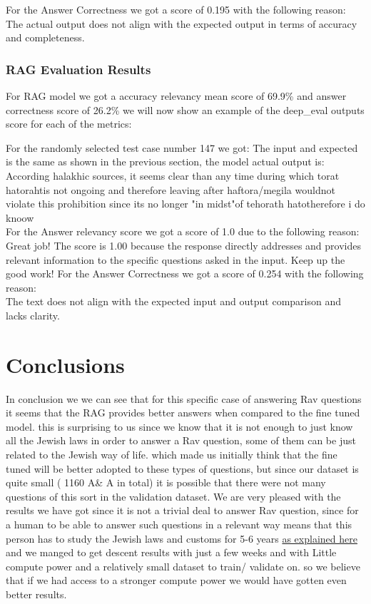 \documentclass[11pt]{article}
\begin{document}
For the Answer Correctness  we got a score of 0.195 with the following reason: \\
The actual output does not align with the expected output in terms of accuracy and completeness.


\subsubsection{RAG Evaluation Results}
For RAG model we got a accuracy relevancy mean score of 69.9\% and answer correctness score of 26.2\% we will now show an example of the deep\_eval outputs score for each of the metrics:

For the randomly selected test case number 147 we got:   
The input and expected is the same as shown in the previous section, the model actual output is:\\
According  halakhic sources, it seems clear than any time during which torat hatorahtis not ongoing and therefore leaving after haftora/megila wouldnot violate this prohibition since its no longer "in midst"of tehorath hatotherefore i do knoow\\

For the Answer relevancy score we got a score of 1.0 due to the following reason:\\
Great job! The score is 1.00 because the response directly addresses and provides relevant information to the specific questions asked in the input. Keep up the good work!
For the Answer Correctness  we got a score of 0.254 with the following reason:\\
The text does not align with the expected input and output comparison and lacks clarity.

\section{Conclusions}
In conclusion we we can see that for this specific case of answering Rav questions it seems that the RAG provides better answers when compared to the fine tuned model. this is surprising to us since we know that it is not enough to just know all the Jewish laws in order to answer a Rav question, some of them can be just related to the Jewish way of life. which made us initially think that the fine tuned will be better adopted to these types of questions, but since our dataset is quite small ( 1160 A\& A in total) it is possible that there were not many questions of this sort in the validation dataset.
We are very pleased with the results we have got since it is not a trivial deal to answer Rav question, since for a human to be able to answer such questions in a relevant way means that this person has to study the Jewish laws and customs for 5-6 years  \href{https://hds.harvard.edu/academics/ministry-studies/denominational-instruction/ordination-requirements/jewish-ordination#:~:text=This%20is%20a%20process%20that,fields%20of%20study%20or%20work. }{as explained here}  and we manged to get descent results with just a few weeks and with Little compute power and a relatively small dataset to train/ validate on. so we believe that if we had access to a stronger compute power we would have gotten even better results.
\end{document}
